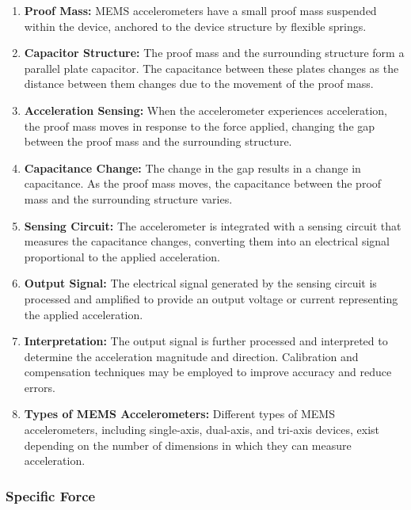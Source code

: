 \begin{enumerate}
  \item \textbf{Proof Mass:} MEMS accelerometers have a small proof mass suspended within the device, anchored to the device structure by flexible springs.

  \item \textbf{Capacitor Structure:} The proof mass and the surrounding structure form a parallel plate capacitor. The capacitance between these plates changes as the distance between them changes due to the movement of the proof mass.

  \item \textbf{Acceleration Sensing:} When the accelerometer experiences acceleration, the proof mass moves in response to the force applied, changing the gap between the proof mass and the surrounding structure.

  \item \textbf{Capacitance Change:} The change in the gap results in a change in capacitance. As the proof mass moves, the capacitance between the proof mass and the surrounding structure varies.

  \item \textbf{Sensing Circuit:} The accelerometer is integrated with a sensing circuit that measures the capacitance changes, converting them into an electrical signal proportional to the applied acceleration.

  \item \textbf{Output Signal:} The electrical signal generated by the sensing circuit is processed and amplified to provide an output voltage or current representing the applied acceleration.

  \item \textbf{Interpretation:} The output signal is further processed and interpreted to determine the acceleration magnitude and direction. Calibration and compensation techniques may be employed to improve accuracy and reduce errors.

  \item \textbf{Types of MEMS Accelerometers:} Different types of MEMS accelerometers, including single-axis, dual-axis, and tri-axis devices, exist depending on the number of dimensions in which they can measure acceleration.
\end{enumerate}


\subsubsection{Specific Force}

